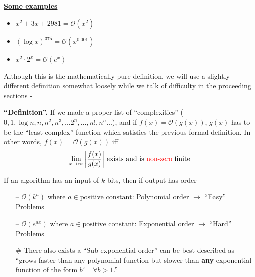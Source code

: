 			\textbf{\underline{Some examples}}-
			\begin{itemize}
				\item \(x^2 + 3x + 2981= \mathcal{O}(x^2)\)
				\item \((\log x)^{375} = \mathcal{O}(x^{0.001})\)
				\item \(x^2 \cdot 2^x= \mathcal{O}(e^x)\)
			\end{itemize}

			Although this is the mathematically pure definition, we will use a slightly different definition somewhat loosely while we talk of difficulty in the proceeding sections -

			\begin{mybox}
				\textbf{``Definition''.} If we made a proper list of ``complexities'' ($0, 1, \log n, n, n^2, n^3, \ldots 2^n, \ldots, n!, n^n\ldots$), and if \(f(x) = \mathcal{O}(g(x))\),  \(g(x)\) has to be the ``least complex'' function which satisfies the previous formal definition.
				\tcblower
				In other words, $f(x)= \mathcal{O}(g(x))$ iff \[\lim_{x\to\infty} \bigg|\frac{f(x)}{g(x)}\bigg|\text{ exists and is \textcolor{red}{non-zero} finite}\]
			\end{mybox}

			If an algorithm has an input of \(k\)-bits, then if output has order-
			\begin{itemize}
				\item[--] \(\mathcal{O}(k^a)\) where \(a \in \text{positive constant}\): Polynomial order \(\to\) ``Easy'' Problems
				\item[--] \(\mathcal{O}(e^{ax})\) where \(a \in \text{positive constant}\): Exponential order \(\to\) ``Hard'' Problems 
				\item[$\#$] There also exists a ``Sub-exponential order'' can be best described as ``grows faster than any polynomial function but slower than \textbf{any} exponential function of the form \(b^x \quad\forall b>1\).''
			\end{itemize}

